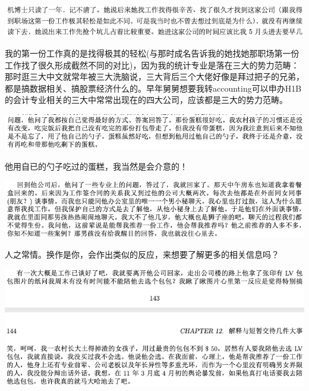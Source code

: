 \documentclass[9pt, b5paper]{article}
\begin{document}
\begin{center}
\includegraphics[width=.9\linewidth]{./pic/backups_plans_20210412_113317.png}
\end{center}

我的第一份工作真的是找得极其的轻松(与那时成名告诉我的她找她那职场第一份工作找了很久形成截然不同的对比)，因为我的统计专业是落在三大的势力范畴：那时逛三大中文就常年被三大洗脑说，三大背后三个大佬好像是拜过把子的兄弟，都是搞数据相关、搞股票经济什么的。早年舅舅想要我转accounting可以申办H1B的会计专业相关的三大中常常出现在的四大公司，应该都是三大的势力范畴。

\begin{center}
\includegraphics[width=.9\linewidth]{./pic/backups_plans_20210412_104506.png}
\end{center}

他用自已的勺子吃过的蛋糕，我当然是会介意的！

\begin{center}
\includegraphics[width=.9\linewidth]{./pic/backups_plans_20210412_104626.png}
\end{center}

人之常情。换作是你，会作出类似的反应，来想要了解更多的相关信息吗？

\begin{center}
\includegraphics[width=.9\linewidth]{./pic/backups_plans_20210412_104740.png}
\end{center}
\end{document}
